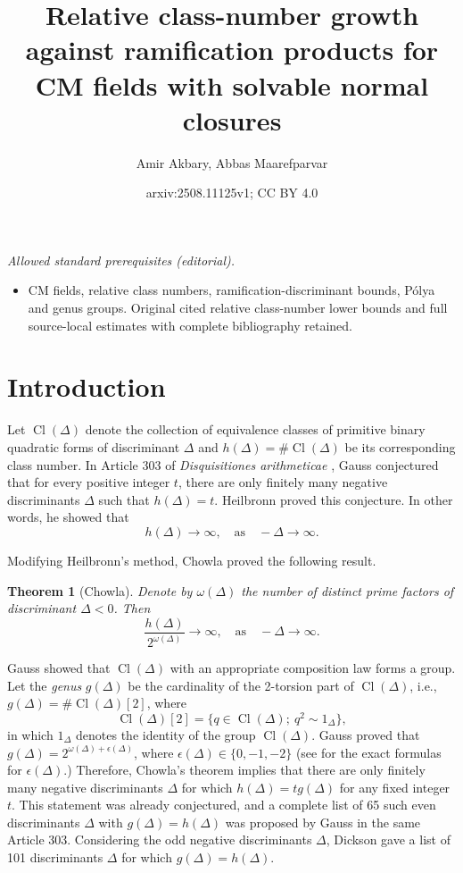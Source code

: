 \documentclass[12pt]{amsart}
\title{Relative class-number growth against ramification products for CM fields with solvable normal closures}
\author{Amir Akbary, Abbas Maarefparvar}
\date{arxiv:2508.11125v1; CC BY 4.0}
\newtheorem{theorem}{Theorem}[section]
\theoremstyle{definition}
\numberwithin{equation}{section}
\DeclareMathOperator{\Cl}{Cl}
\begin{document}
\maketitle
\noindent\textit{Allowed standard prerequisites (editorial).}\begin{itemize}
\item CM fields, relative class numbers, ramification-discriminant bounds, Pólya and genus groups. Original cited relative class-number lower bounds and full source-local estimates with complete bibliography retained.
\end{itemize}\medskip
\section{Introduction}

Let $\Cl(\Delta)$ denote the collection of equivalence classes of primitive binary quadratic forms of discriminant $\Delta$ and $h(\Delta)=\#\Cl(\Delta)$ be its corresponding class number. In Article 303 of \textit{Disquisitiones arithmeticae} \cite{Gauss}, Gauss 
conjectured that
for every positive integer $t$, there are only finitely many negative discriminants $\Delta$ such that $h(\Delta)=t$.
Heilbronn  \cite{Heilbronn} proved this conjecture. In other words, he showed that
\begin{equation*}
h(\Delta) \rightarrow \infty,  \quad \text{as} \quad -\Delta \rightarrow \infty.
\end{equation*}

Modifying Heilbronn's method, Chowla \cite{Chowla} proved the following result.


\begin{theorem}[Chowla] \label{theorem, Chowla}
Denote by $\omega(\Delta)$ the number of distinct prime factors of  discriminant $\Delta<0$. Then
\begin{equation*}
\frac{	h(\Delta)}{2^{\omega(\Delta)}} \rightarrow \infty,  \quad \text{as} \quad -\Delta \rightarrow \infty.
\end{equation*}
\end{theorem}
Gauss showed that $\Cl(\Delta)$ with an appropriate composition law forms a group. Let the \emph{genus} $g(\Delta)$ be the cardinality of the 2-torsion part of $\Cl(\Delta)$, i.e., $g(\Delta)=\#\Cl(\Delta)[2]$, where
\begin{equation*}
\Cl(\Delta)[2]=\{q\in \Cl(\Delta);~q^2\sim 1_\Delta\},
\end{equation*}
 in which $1_\Delta$ denotes the identity of the group $\Cl(\Delta)$. Gauss proved that $g(\Delta)=2^{\omega(\Delta)+\epsilon(\Delta)}$, where $\epsilon(\Delta)\in \{0, -1, -2\}$ (see \cite[Section 2.2]{Kani} for the exact formulas for $\epsilon(\Delta)$.) Therefore, Chowla's theorem implies that there are only finitely many negative discriminants $\Delta$ for which   
$h(\Delta)=t g(\Delta)$ for any fixed integer $t$. This statement was already conjectured, and a complete list of 65 such even discriminants $\Delta$ with $g(\Delta)=h(\Delta)$ was proposed by Gauss in the same Article 303. Considering the odd negative discriminants $\Delta$, Dickson \cite[pp. 88-89]{Dickson} gave a list of 101 discriminants $\Delta$ for which $g(\Delta)=h(\Delta)$.
\end{document}
